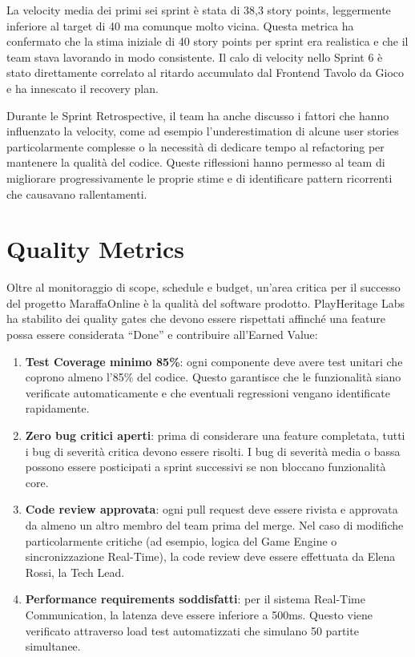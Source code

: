 La velocity media dei primi sei sprint è stata di 38,3 story points, leggermente inferiore al target di 40 ma comunque molto vicina. Questa metrica ha confermato che la stima iniziale di 40 story points per sprint era realistica e che il team stava lavorando in modo consistente. Il calo di velocity nello Sprint 6 è stato direttamente correlato al ritardo accumulato dal Frontend Tavolo da Gioco e ha innescato il recovery plan.

Durante le Sprint Retrospective, il team ha anche discusso i fattori che hanno influenzato la velocity, come ad esempio l'underestimation di alcune user stories particolarmente complesse o la necessità di dedicare tempo al refactoring per mantenere la qualità del codice. Queste riflessioni hanno permesso al team di migliorare progressivamente le proprie stime e di identificare pattern ricorrenti che causavano rallentamenti.

\section{Quality Metrics}

Oltre al monitoraggio di scope, schedule e budget, un'area critica per il successo del progetto MaraffaOnline è la qualità del software prodotto. PlayHeritage Labs ha stabilito dei quality gates che devono essere rispettati affinché una feature possa essere considerata ``Done'' e contribuire all'Earned Value:

\begin{enumerate}
    \item \textbf{Test Coverage minimo 85\%}: ogni componente deve avere test unitari che coprono almeno l'85\% del codice. Questo garantisce che le funzionalità siano verificate automaticamente e che eventuali regressioni vengano identificate rapidamente.
    \item \textbf{Zero bug critici aperti}: prima di considerare una feature completata, tutti i bug di severità critica devono essere risolti. I bug di severità media o bassa possono essere posticipati a sprint successivi se non bloccano funzionalità core.
    \item \textbf{Code review approvata}: ogni pull request deve essere rivista e approvata da almeno un altro membro del team prima del merge. Nel caso di modifiche particolarmente critiche (ad esempio, logica del Game Engine o sincronizzazione Real-Time), la code review deve essere effettuata da Elena Rossi, la Tech Lead.
    \item \textbf{Performance requirements soddisfatti}: per il sistema Real-Time Communication, la latenza deve essere inferiore a 500ms. Questo viene verificato attraverso load test automatizzati che simulano 50 partite simultanee.
\end{enumerate}


